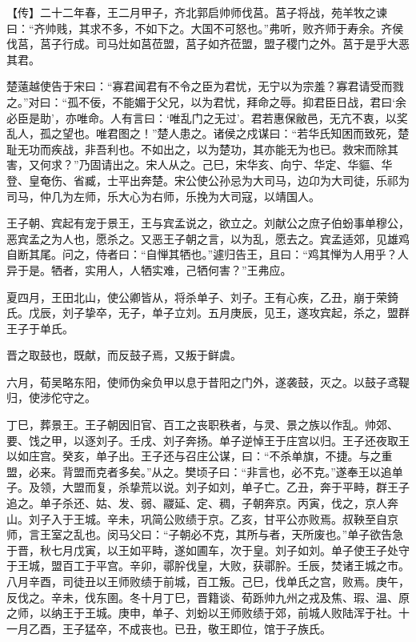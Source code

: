 \documentclass[]{article}
\begin{document}
【传】二十二年春，王二月甲子，齐北郭启帅师伐莒。莒子将战，苑羊牧之谏曰：``齐帅贱，其求不多，不如下之。大国不可怒也。''弗听，败齐师于寿余。齐侯伐莒，莒子行成。司马灶如莒莅盟，莒子如齐莅盟，盟子稷门之外。莒于是乎大恶其君。

楚薳越使告于宋曰：``寡君闻君有不令之臣为君忧，无宁以为宗羞？寡君请受而戮之。''对曰：``孤不佞，不能媚于父兄，以为君忧，拜命之辱。抑君臣日战，君曰`余必臣是助'，亦唯命。人有言曰：`唯乱门之无过'。君若惠保敝邑，无亢不衷，以奖乱人，孤之望也。唯君图之！''楚人患之。诸侯之戍谋曰：``若华氏知困而致死，楚耻无功而疾战，非吾利也。不如出之，以为楚功，其亦能无为也已。救宋而除其害，又何求？''乃固请出之。宋人从之。己巳，宋华亥、向宁、华定、华貙、华登、皇奄伤、省臧，士平出奔楚。宋公使公孙忌为大司马，边卬为大司徒，乐祁为司马，仲几为左师，乐大心为右师，乐挽为大司寇，以靖国人。

王子朝、宾起有宠于景王，王与宾孟说之，欲立之。刘献公之庶子伯蚡事单穆公，恶宾孟之为人也，愿杀之。又恶王子朝之言，以为乱，愿去之。宾孟适郊，见雄鸡自断其尾。问之，侍者曰：``自惮其牺也。''遽归告王，且曰：``鸡其惮为人用乎？人异于是。牺者，实用人，人牺实难，己牺何害？''王弗应。

夏四月，王田北山，使公卿皆从，将杀单子、刘子。王有心疾，乙丑，崩于荣錡氏。戊辰，刘子挚卒，无子，单子立刘。五月庚辰，见王，遂攻宾起，杀之，盟群王子于单氏。

晋之取鼓也，既献，而反鼓子焉，又叛于鲜虞。

六月，荀吴略东阳，使师伪籴负甲以息于昔阳之门外，遂袭鼓，灭之。以鼓子鸢鞮归，使涉佗守之。

丁巳，葬景王。王子朝因旧官、百工之丧职秩者，与灵、景之族以作乱。帅郊、要、饯之甲，以逐刘子。壬戌、刘子奔扬。单子逆悼王于庄宫以归。王子还夜取王以如庄宫。癸亥，单子出。王子还与召庄公谋，曰：``不杀单旗，不捷。与之重盟，必来。背盟而克者多矣。''从之。樊顷子曰：``非言也，必不克。''遂奉王以追单子。及领，大盟而复，杀挚荒以说。刘子如刘，单子亡。乙丑，奔于平畤，群王子追之。单子杀还、姑、发、弱、鬷延、定、稠，子朝奔京。丙寅，伐之，京人奔山。刘子入于王城。辛未，巩简公败绩于京。乙亥，甘平公亦败焉。叔鞅至自京师，言王室之乱也。闵马父曰：``子朝必不克，其所与者，天所废也。''单子欲告急于晋，秋七月戊寅，以王如平畤，遂如圃车，次于皇。刘子如刘。单子使王子处守于王城，盟百工于平宫。辛卯，鄩肸伐皇，大败，获鄩肸。壬辰，焚诸王城之市。八月辛酉，司徒丑以王师败绩于前城，百工叛。己巳，伐单氏之宫，败焉。庚午，反伐之。辛未，伐东圉。冬十月丁巳，晋籍谈、荀跞帅九州之戎及焦、瑕、温、原之师，以纳王于王城。庚申，单子、刘蚡以王师败绩于郊，前城人败陆浑于社。十一月乙酉，王子猛卒，不成丧也。已丑，敬王即位，馆于子族氏。
\end{document}
